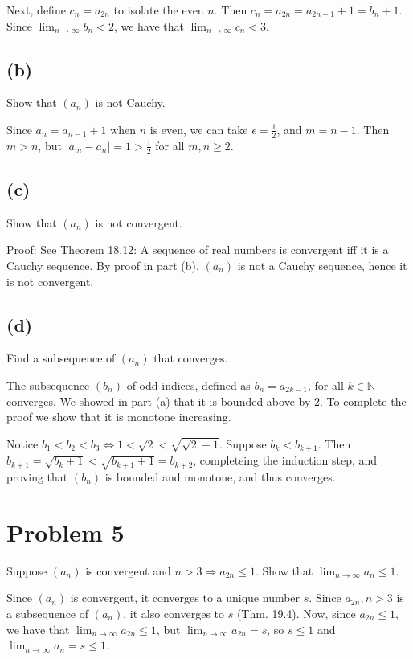 \documentclass{article}
\begin{document}
Next, define $c_n = a_{2n}$ to isolate the even $n$. Then $c_n = a_{2n} = a_{2n - 1} + 1 = b_n + 1$. Since $\lim_{n \rightarrow \infty} b_n < 2$, we have that $\lim_{n \rightarrow \infty} c_n < 3$. 

\subsection*{(b)}
Show that $(a_n)$ is not Cauchy. 

Since $a_n = a_{n-1} + 1$ when $n$ is even, we can take $\epsilon = \frac{1}{2}$, and $m = n-1$. Then $m > n$, but $\left|a_m - a_n\right| = 1 > \frac{1}{2}$ for all $m, n \geq 2$. 

\subsection*{(c)}

Show that $(a_n)$ is not convergent. 

Proof: See Theorem 18.12: A sequence of real numbers is convergent iff it is a Cauchy sequence. By proof in part (b), $(a_n)$ is not a Cauchy sequence, hence it is not convergent. 

\subsection*{(d)}

Find a subsequence of $(a_n)$ that converges. 

The subsequence $(b_n)$ of odd indices, defined as $b_n = a_{2k - 1}$, for all $k \in \mathbb{N}$ converges. We showed in part (a) that it is bounded above by 2. To complete the proof we show that it is monotone increasing. 

Notice $b_1 < b_2 < b_3 \Leftrightarrow 1 < \sqrt{2} < \sqrt{\sqrt{2} + 1}$. 
Suppose $b_k < b_{k+1}$. 
Then $b_{k+1} = \sqrt{b_k + 1} < \sqrt{b_{k + 1} + 1} = b_{k+2}$, completeing the induction step, and proving that $(b_n)$ is bounded and monotone, and thus converges. 

\section*{Problem 5}

Suppose $(a_n)$ is convergent and $n > 3 \Rightarrow a_{2n} \leq 1$. Show that $\lim_{n \rightarrow \infty} a_n \leq 1$. 

Since $(a_n)$ is convergent, it converges to a unique number $s$. Since $a_{2n}, n > 3$ is a subsequence of $(a_n)$, it also converges to $s$ (Thm. 19.4). Now, since $a_{2n} \leq 1$, we have that $\lim_{n \rightarrow \infty} a_{2n} \leq 1$, but $\lim_{n \rightarrow \infty} a_{2n} = s$, so $s \leq 1$ and $\lim_{n \rightarrow \infty} a_n = s \leq 1$. 
\end{document}
